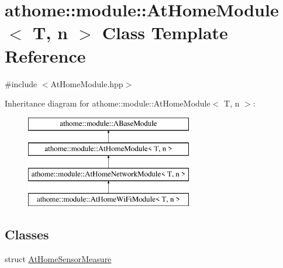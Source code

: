 \hypertarget{classathome_1_1module_1_1_at_home_module}{}\section{athome\+:\+:module\+:\+:At\+Home\+Module$<$ T, n $>$ Class Template Reference}
\label{classathome_1_1module_1_1_at_home_module}


{\ttfamily \#include $<$At\+Home\+Module.\+hpp$>$}

Inheritance diagram for athome\+:\+:module\+:\+:At\+Home\+Module$<$ T, n $>$\+:\begin{figure}[H]
\begin{center}
\leavevmode
\includegraphics[height=4.000000cm]{classathome_1_1module_1_1_at_home_module}
\end{center}
\end{figure}
\subsection*{Classes}
\begin{DoxyCompactItemize}
\item 
struct \mbox{\hyperlink{structathome_1_1module_1_1_at_home_module_1_1_at_home_sensor_measure}{At\+Home\+Sensor\+Measure}}
\end{DoxyCompactItemize}
